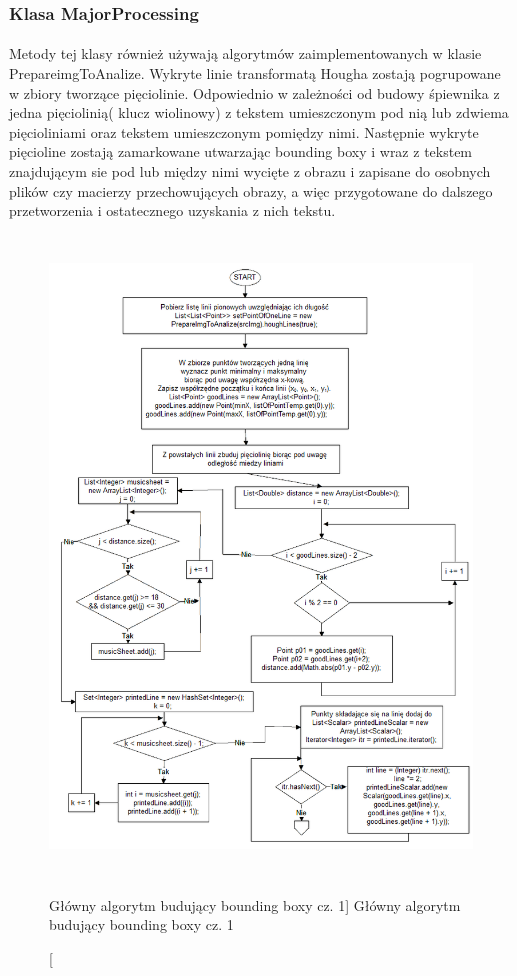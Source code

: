 \documentclass[a4paper,12pt]{article}
\begin{document}
		        \newpage 
		 
	    \subsubsection{Klasa MajorProcessing}
		    \paragraph{} Metody tej klasy również używają algorytmów zaimplementowanych     w klasie PrepareimgToAnalize. Wykryte linie transformatą Hougha zostają     pogrupowane w zbiory tworzące pięciolinie. Odpowiednio w zależności od      budowy śpiewnika z jedna pięciolinią( klucz wiolinowy) z tekstem            umieszczonym pod nią lub zdwiema pięcioliniami oraz tekstem umieszczonym     pomiędzy nimi. Następnie wykryte pięcioline zostają zamarkowane             utwarzając bounding boxy i wraz z tekstem znajdującym sie pod lub między     nimi wycięte z obrazu i zapisane do osobnych plików czy macierzy            przechowujących obrazy, a więc przygotowane do dalszego przetworzenia i     ostatecznego uzyskania z nich tekstu.
		
			\begin{figure}[!ht]  
			    \begin{center}
				    \includegraphics[height=17cm]{image//algorithm//majorProcesing_01.png} 
			    \end{center}
			    \caption
    			    [Główny algorytm budujący bounding boxy cz. 1]  
    			    {Główny algorytm budujący bounding boxy cz. 1}  
		    \end{figure}
			
\end{document}
